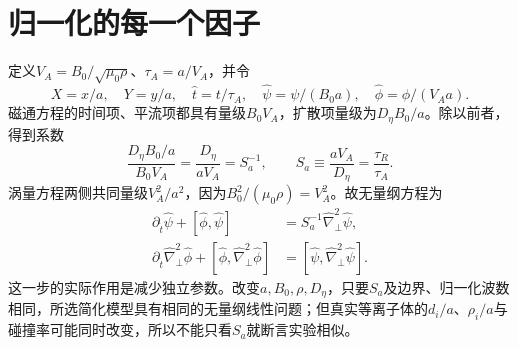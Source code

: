 \section{归一化的每一个因子}
定义$V_A=B_0/\sqrt{\mu_0\rho}$、$\tau_A=a/V_A$，并令
\begin{equation}
 X=x/a,\quad Y=y/a,\quad \hat t=t/\tau_A,\quad
 \hat\psi=\psi/(B_0a),\quad \hat\phi=\phi/(V_Aa).
\end{equation}
磁通方程的时间项、平流项都具有量级$B_0V_A$，扩散项量级为$D_\eta B_0/a$。除以前者，得到系数
\begin{equation}
 \frac{D_\eta B_0/a}{B_0V_A}=\frac{D_\eta}{aV_A}=S_a^{-1},
 \qquad S_a\equiv\frac{aV_A}{D_\eta}=\frac{\tau_R}{\tau_A}.
\end{equation}
涡量方程两侧共同量级$V_A^2/a^2$，因为$B_0^2/(\mu_0\rho)=V_A^2$。故无量纲方程为
\begin{align}
 \partial_{\hat t}\hat\psi+[\hat\phi,\hat\psi]&=S_a^{-1}\hat\nabla_\perp^2\hat\psi,\\
 \partial_{\hat t}\hat\nabla_\perp^2\hat\phi+[\hat\phi,\hat\nabla_\perp^2\hat\phi]
 &=[\hat\psi,\hat\nabla_\perp^2\hat\psi].
\end{align}
这一步的实际作用是减少独立参数。改变$a,B_0,\rho,D_\eta$，只要$S_a$及边界、归一化波数相同，所选简化模型具有相同的无量纲线性问题；但真实等离子体的$d_i/a$、$\rho_i/a$与碰撞率可能同时改变，所以不能只看$S_a$就断言实验相似。
